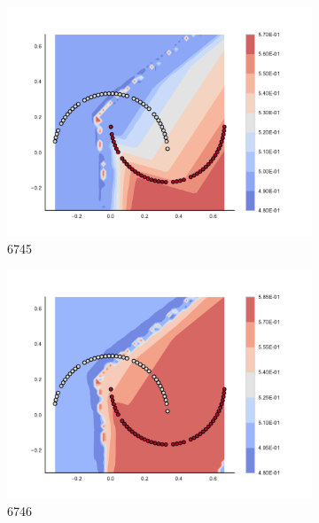 \begin{figure}[h]
\begin{subfigure}[b]{0.09\textwidth}
    \includegraphics[clip, trim=2.35cm 1.75cm 4.5cm 0cm,width=\textwidth]{img/convergence/6745.pdf}
    \caption{6745}
    \label{fig:convergence_6745}
\end{subfigure}
%
\begin{subfigure}[b]{0.09\textwidth}
    \includegraphics[clip, trim=2.35cm 1.75cm 4.5cm 0cm,width=\textwidth]{img/convergence/6746.pdf}
    \caption{6746}
    \label{fig:convergence_6746}
\end{subfigure}
%
\begin{subfigure}[b]{0.09\textwidth}

\end{subfigure}
\end{figure}
